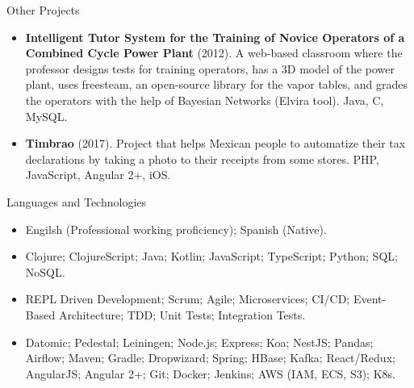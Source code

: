 \documentclass[calibri]{../mcdowell-cv/mcdowellcv}
\begin{document}
	\begin{cvsection}{Other Projects}
		\begin{cvsubsection}{}{}{}	
			\begin{itemize}
				\item \textbf{Intelligent Tutor System for the Training of Novice Operators of a Combined Cycle Power Plant} (2012). A web-based classroom where the professor designs tests for training operators, has a 3D model of the power plant, uses freesteam, an open-source library for the vapor tables, and grades the operators with the help of Bayesian Networks (Elvira tool). Java, C, MySQL.
				\item \textbf{Timbrao} (2017). Project that helps Mexican people to automatize their tax declarations by taking a photo to their receipts from some stores. PHP, JavaScript, Angular 2+, iOS.
			\end{itemize}
		\end{cvsubsection}
	\end{cvsection}
	
	\begin{cvsection}{Languages and Technologies}
		\begin{cvsubsection}{}{}{}	
			\begin{itemize}
				\item Engilsh (Professional working proficiency); Spanish (Native).
				\item Clojure; ClojureScript; Java; Kotlin; JavaScript; TypeScript; Python; SQL; NoSQL.
				\item REPL Driven Development; Scrum; Agile; Microservices; CI/CD; Event-Based Architecture; TDD; Unit Tests; Integration Tests.
				\item Datomic; Pedestal; Leiningen; Node.js; Express; Koa; NestJS; Pandas; Airflow; Maven; Gradle; Dropwizard; Spring; HBase; Kafka; React/Redux; AngularJS; Angular 2+; Git; Docker; Jenkins; AWS (IAM, ECS, S3); K8s.
			\end{itemize}
		\end{cvsubsection}
	\end{cvsection}
\end{document}
